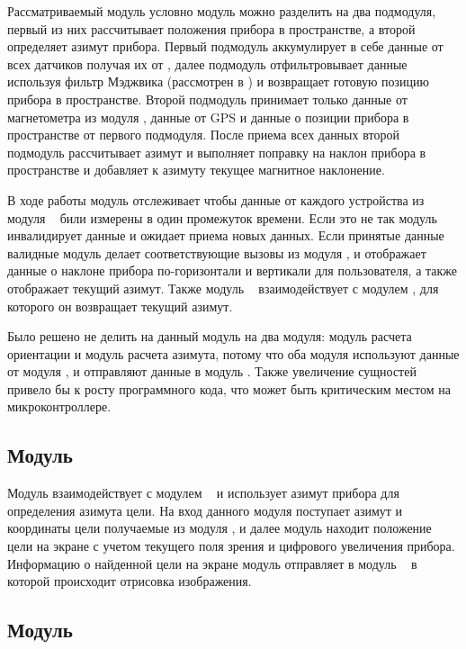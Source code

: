 Рассматриваемый модуль условно модуль можно разделить на два подмодуля, первый из них рассчитывает положения прибора в пространстве,
а второй определяет азимут прибора. Первый подмодуль аккумулирует в себе данные от всех датчиков получая их от \moduleCalib, 
далее подмодуль отфильтровывает данные используя фильтр Мэджвика (рассмотрен в ) и возвращает готовую позицию прибора в пространстве.
Второй подмодуль принимает только данные от магнетометра из модуля \moduleCalib, данные от GPS и данные о позиции прибора в пространстве
от первого подмодуля.
После приема всех данных второй подмодуль рассчитывает азимут и выполняет поправку на наклон прибора в 
пространстве и добавляет к азимуту текущее магнитное наклонение.

В ходе работы модуль отслеживает чтобы данные от каждого устройства из модуля \moduleCalib~ били измерены в один промежуток времени. Если это не так
модуль инвалидирует данные и ожидает приема новых данных. Если принятые данные валидные модуль делает соответствующие вызовы из
модуля \moduleGraphics, и отображает данные о наклоне прибора по-горизонтали и вертикали для пользователя, а также отображает текущий азимут.
Также модуль \moduleFlashMemory~ взаимодействует с модулем \moduleFindTarget, для которого он возвращает текущий азимут.

Было решено не делить на данный модуль на два модуля: модуль расчета ориентации и модуль расчета азимута, потому что оба модуля используют данные от модуля
\moduleCalib, и отправляют данные в модуль \moduleGraphics. Также увеличение сущностей привело бы к росту программного кода, что может быть критическим местом
на микроконтроллере.

\subsection{Модуль \moduleFindTarget}

Модуль взаимодействует с модулем \moduleFlashMemory~ и использует азимут прибора для определения азимута цели. 
На вход данного модуля поступает азимут и координаты цели получаемые из модуля \moduleUart , и далее модуль находит положение цели на экране с учетом
текущего поля зрения и цифрового увеличения прибора. Информацию о найденной цели на экране модуль отправляет в модуль \moduleGraphics~ 
в которой происходит отрисовка изображения.

\subsection{Модуль \moduleFlashMemory}


